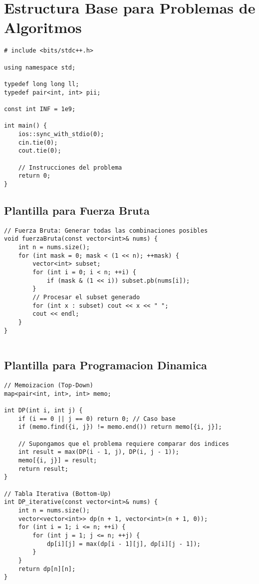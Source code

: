 \section{Estructura Base para Problemas de Algoritmos}

\begin{lstlisting}[style=cpp]
# include <bits/stdc++.h>

using namespace std;

typedef long long ll;
typedef pair<int, int> pii;

const int INF = 1e9;

int main() {
    ios::sync_with_stdio(0);
    cin.tie(0);
    cout.tie(0);

    // Instrucciones del problema
    return 0;
}
\end{lstlisting}


\subsection{Plantilla para Fuerza Bruta}

\begin{lstlisting}[style=cpp]
// Fuerza Bruta: Generar todas las combinaciones posibles
void fuerzaBruta(const vector<int>& nums) {
    int n = nums.size();
    for (int mask = 0; mask < (1 << n); ++mask) {
        vector<int> subset;
        for (int i = 0; i < n; ++i) {
            if (mask & (1 << i)) subset.pb(nums[i]);
        }
        // Procesar el subset generado
        for (int x : subset) cout << x << " ";
        cout << endl;
    }
}


\end{lstlisting}

\subsection{Plantilla para Programacion Dinamica}

\begin{lstlisting}[style=cpp]
// Memoizacion (Top-Down)
map<pair<int, int>, int> memo;

int DP(int i, int j) {
    if (i == 0 || j == 0) return 0; // Caso base
    if (memo.find({i, j}) != memo.end()) return memo[{i, j}];
    
    // Supongamos que el problema requiere comparar dos indices
    int result = max(DP(i - 1, j), DP(i, j - 1));
    memo[{i, j}] = result;
    return result;
}

// Tabla Iterativa (Bottom-Up)
int DP_iterative(const vector<int>& nums) {
    int n = nums.size();
    vector<vector<int>> dp(n + 1, vector<int>(n + 1, 0));
    for (int i = 1; i <= n; ++i) {
        for (int j = 1; j <= n; ++j) {
            dp[i][j] = max(dp[i - 1][j], dp[i][j - 1]);
        }
    }
    return dp[n][n];
}


\end{lstlisting}

